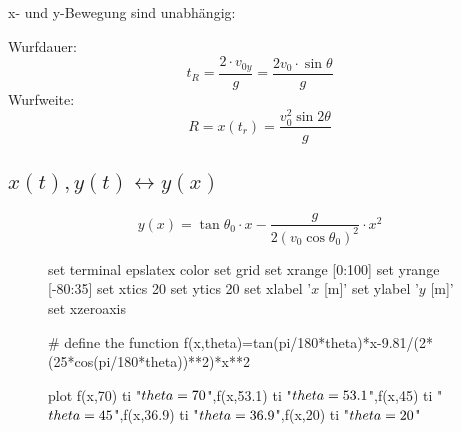 x- und y-Bewegung sind unabhängig:
\newline
\begin{footnotesize}
\end{footnotesize}
\newline
\newline
Wurfdauer:
\[
	\boxed{t_R=\frac{2 \cdot v_{0y}}{g}=\frac{2v_0 \cdot\sin\theta}{g}}
\]
\newline
Wurfweite:
\[
	\boxed{R=x(t_r)=\frac{v_0^2\sin2\theta}{g}}
\]
\newline

\subsection{$x(t),y(t)\leftrightarrow y(x)$}
\[
	\boxed{
		y(x)=\tan\theta_0 \cdot x-\frac{g}{2(v_0\cos\theta_0)^2}\cdot x^2
	}
\]
\newline
\begin{figure}[htbp]
\centering
\begin{gnuplot}[scale=0.62]
	set terminal epslatex color
	set grid
  set xrange [0:100]
	set yrange [-80:35]
	set xtics 20
	set ytics 20
	set xlabel '$x$ [m]'
	set ylabel '$y$ [m]'
	set xzeroaxis
	
  # define the function
  f(x,theta)=tan(pi/180*theta)*x-9.81/(2*(25*cos(pi/180*theta))**2)*x**2

  plot f(x,70) ti "$\\theta=70$",f(x,53.1) ti "$\\theta=53.1$",f(x,45) ti "$\\theta=45$",f(x,36.9) ti "$\\theta=36.9$",f(x,20) ti "$\\theta=20$"
\end{gnuplot}
\end{figure}

